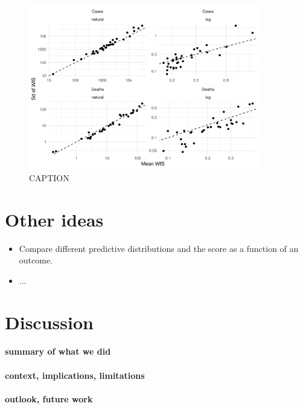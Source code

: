\documentclass{article}
\begin{document}
\begin{figure}[h!]
    \centering
    \includegraphics[width=0.9\textwidth]{output/figures/HUB-sd-vs-mean-scores.png}
    \caption{CAPTION}
    \label{fig:HUB-mean-sd-scores}
\end{figure}




\section{Other ideas}
\begin{itemize}
    \item Compare different predictive distributions and the score as a function of an outcome.
    \item ...
\end{itemize}




\section{Discussion}

\paragraph{summary of what we did}

\paragraph{context, implications, limitations}

\paragraph{outlook, future work}
\end{document}
